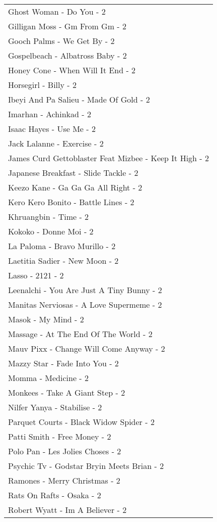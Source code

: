 \documentclass[
]{article}
\begin{document}
\begin{longtable}{l}
Ghost Woman - Do You - 2 \\ 
Gilligan Moss - Gm From Gm - 2 \\ 
Gooch Palms - We Get By - 2 \\ 
Gospelbeach - Albatross Baby - 2 \\ 
Honey Cone - When Will It End - 2 \\ 
Horsegirl - Billy - 2 \\ 
Ibeyi And Pa Salieu - Made Of Gold - 2 \\ 
Imarhan - Achinkad - 2 \\ 
Isaac Hayes - Use Me - 2 \\ 
Jack Lalanne - Exercise - 2 \\ 
James Curd Gettoblaster Feat Mizbee - Keep It High - 2 \\ 
Japanese Breakfast - Slide Tackle - 2 \\ 
Keezo Kane - Ga Ga Ga All Right - 2 \\ 
Kero Kero Bonito - Battle Lines - 2 \\ 
Khruangbin - Time - 2 \\ 
Kokoko - Donne Moi - 2 \\ 
La Paloma - Bravo Murillo - 2 \\ 
Laetitia Sadier - New Moon - 2 \\ 
Lasso - 2121 - 2 \\ 
Leenalchi - You Are Just A Tiny Bunny - 2 \\ 
Manitas Nerviosas - A Love Supermeme - 2 \\ 
Masok - My Mind - 2 \\ 
Massage - At The End Of The World - 2 \\ 
Mauv Pixx - Change Will Come Anyway - 2 \\ 
Mazzy Star - Fade Into You - 2 \\ 
Momma - Medicine - 2 \\ 
Monkees - Take A Giant Step - 2 \\ 
Nilfer Yanya - Stabilise - 2 \\ 
Parquet Courts - Black Widow Spider - 2 \\ 
Patti Smith - Free Money - 2 \\ 
Polo Pan - Les Jolies Choses - 2 \\ 
Psychic Tv - Godstar Bryin Meets Brian - 2 \\ 
Ramones - Merry Christmas - 2 \\ 
Rats On Rafts - Osaka - 2 \\ 
Robert Wyatt - Im A Believer - 2 \\ 

\end{longtable}
\end{document}
